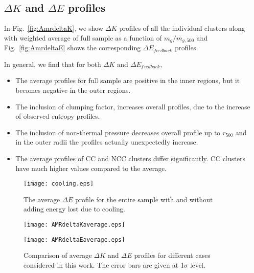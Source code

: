 \documentclass[a4paper,fleqn,usenatbib]{mnras}
\begin{document}
\subsection{$\Delta K$ and $\Delta E$ profiles}
In Fig.~\ref{fig:AmrdeltaK}, we show $\Delta K$ profiles of all the individual clusters along with weighted average of full sample as a function of $m_g/m_{g,500}$ and Fig.~\ref{fig:AmrdeltaE} shows the corresponding $\Delta E_{feedback}$  profiles. 

In general, we find that for both $\Delta K$ and $\Delta E_{feedback}$,
\begin{itemize}
\item The average profiles for full sample are positive in the inner regions, but it becomes negative in the outer regions.
\item The inclusion of clumping factor, increases overall profiles, due to the increase of observed entropy profiles. 
\item The inclusion of non-thermal pressure decreases overall profile up to $r_{500}$ and in the outer radii the profiles actually unexpectedly increase.
\item The average profiles of CC and NCC clusters differ significantly. CC clusters have much higher values compared to the average.
\end{itemize}



\begin{figure}
\begin{minipage}{8.5cm}
\texttt{[image: cooling.eps]}
\end{minipage}
\caption{The average $\Delta E$ profile for the entire sample with and without adding energy lost due to cooling.}
\label{Cooling}
\end{figure} 


\begin{figure*}
\begin{minipage}{8.5cm}
 \texttt{[image: AMRdeltaKaverage.eps]}
\end{minipage}
\begin{minipage}{8.5cm}
 \texttt{[image: AMRdeltaEaverage.eps]}
\end{minipage}   
\caption{Comparison of average $\Delta K$  and $\Delta E$ profiles for different cases considered in this work. 
The error bars are given at 1$\sigma$ level.}
\label{fig:average}
\end{figure*}
\end{document}
